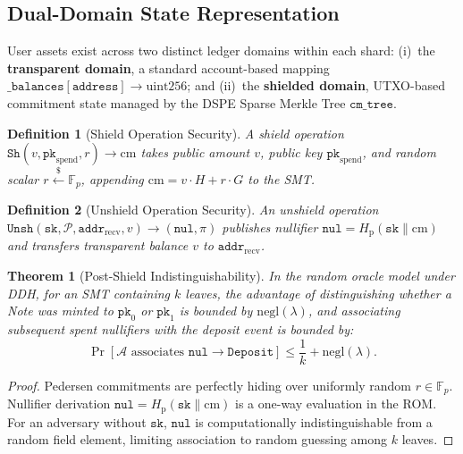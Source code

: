 \documentclass[sigconf,nonacm]{acmart}
\newtheorem{theorem}{Theorem}
\newtheorem{definition}{Definition}
\begin{document}
\subsection{Dual-Domain State Representation}
User assets exist across two distinct ledger domains within each shard: (i)~the \textbf{transparent domain}, a standard account-based mapping $\mathtt{\_balances[address]} \to \text{uint256}$; and (ii)~the \textbf{shielded domain}, UTXO-based commitment state managed by the DSPE Sparse Merkle Tree $\mathtt{cm\_tree}$.

\begin{definition}[Shield Operation Security]
A shield operation $\mathtt{Sh}(v, \mathtt{pk}_{\text{spend}}, r) \to \text{cm}$ takes public amount $v$, public key $\mathtt{pk}_{\text{spend}}$, and random scalar $r \xleftarrow{\$} \mathbb{F}_p$, appending $\text{cm} = v \cdot H + r \cdot G$ to the SMT.
\end{definition}

\begin{definition}[Unshield Operation Security]
An unshield operation $\mathtt{Unsh}(\mathtt{sk}, \mathcal{P}, \mathtt{addr}_{\text{recv}}, v) \to (\mathtt{nul}, \pi)$ publishes nullifier $\mathtt{nul} = H_{\text{p}}(\mathtt{sk} \parallel \text{cm})$ and transfers transparent balance $v$ to $\mathtt{addr}_{\text{recv}}$.
\end{definition}

\begin{theorem}[Post-Shield Indistinguishability]
In the random oracle model under DDH, for an SMT containing $k$ leaves, the advantage of distinguishing whether a Note was minted to $\mathtt{pk}_0$ or $\mathtt{pk}_1$ is bounded by $\text{negl}(\lambda)$, and associating subsequent spent nullifiers with the deposit event is bounded by:
\begin{equation}
\Pr[\mathcal{A} \text{ associates } \mathtt{nul} \to \mathtt{Deposit}] \le \frac{1}{k} + \text{negl}(\lambda).
\end{equation}
\end{theorem}

\begin{proof}
Pedersen commitments are perfectly hiding over uniformly random $r \in \mathbb{F}_p$. Nullifier derivation $\mathtt{nul} = H_{\text{p}}(\mathtt{sk} \parallel \text{cm})$ is a one-way evaluation in the ROM. For an adversary without $\mathtt{sk}$, $\mathtt{nul}$ is computationally indistinguishable from a random field element, limiting association to random guessing among $k$ leaves.
\end{proof}
\end{document}
